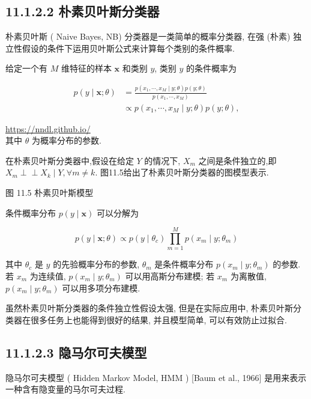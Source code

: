 \documentclass[10pt]{article}
\def\Perp{\perp\!\!\!\perp}
\begin{document}
\subsection*{11.1.2.2 朴素贝叶斯分类器}
朴素贝叶斯 ( Naive Bayes, NB) 分类器是一类简单的概率分类器, 在强 (朴素) 独立性假设的条件下运用贝叶斯公式来计算每个类别的条件概率.

给定一个有 $M$ 维特征的样本 $\boldsymbol{x}$ 和类别 $y$, 类别 $y$ 的条件概率为


\begin{align*}
p(y \mid \boldsymbol{x} ; \theta) & =\frac{p\left(x_{1}, \cdots, x_{M} \mid y ; \theta\right) p(y ; \theta)}{p\left(x_{1}, \cdots, x_{M}\right)}  \tag{11.11}\\
& \propto p\left(x_{1}, \cdots, x_{M} \mid y ; \theta\right) p(y ; \theta), \tag{11.12}
\end{align*}


\href{https://nndl.github.io/}{https://nndl.github.io/}\\
其中 $\theta$ 为概率分布的参数.

在朴素贝叶斯分类器中,假设在给定 $Y$ 的情况下, $X_{m}$ 之间是条件独立的,即 $X_{m} \Perp X_{k} \mid Y, \forall m \neq k$. 图11.5给出了朴素贝叶斯分类器的图模型表示.



图 11.5 朴素贝叶斯模型

条件概率分布 $p(y \mid \boldsymbol{x})$ 可以分解为


\begin{equation*}
p(y \mid \boldsymbol{x} ; \theta) \propto p\left(y \mid \theta_{c}\right) \prod_{m=1}^{M} p\left(x_{m} \mid y ; \theta_{m}\right) \tag{11.13}
\end{equation*}


其中 $\theta_{c}$ 是 $y$ 的先验概率分布的参数, $\theta_{m}$ 是条件概率分布 $p\left(x_{m} \mid y ; \theta_{m}\right)$ 的参数. 若 $x_{m}$ 为连续值, $p\left(x_{m} \mid y ; \theta_{m}\right)$ 可以用高斯分布建模; 若 $x_{m}$ 为离散值, $p\left(x_{m} \mid y ; \theta_{m}\right)$ 可以用多项分布建模.

虽然朴素贝叶斯分类器的条件独立性假设太强, 但是在实际应用中, 朴素贝叶斯分类器在很多任务上也能得到很好的结果, 并且模型简单, 可以有效防止过拟合.

\subsection*{11.1.2.3 隐马尔可夫模型}
隐马尔可夫模型 ( Hidden Markov Model, HMM ) [Baum et al., 1966] 是用来表示一种含有隐变量的马尔可夫过程.
\end{document}

